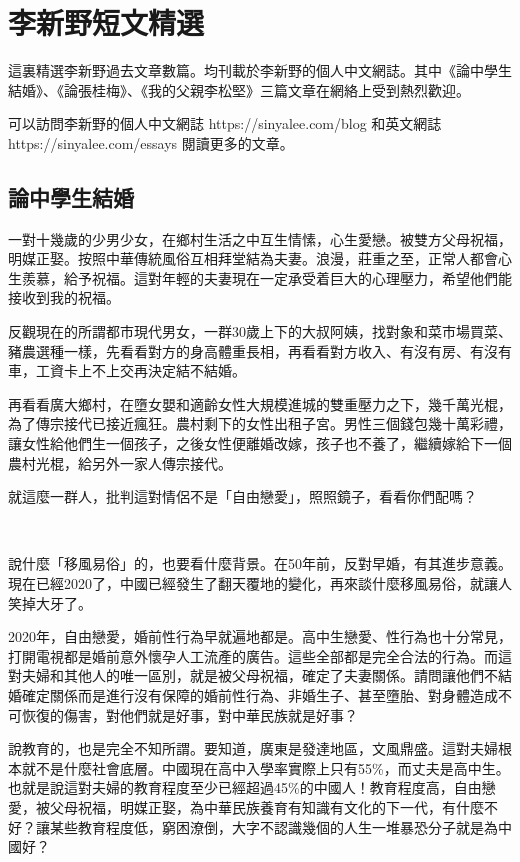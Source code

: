 \chapter{李新野短文精選}

這裏精選李新野過去文章數篇。均刊載於李新野的個人中文網誌。其中《論中學生結婚》、《論張桂梅》、《我的父親李松堅》三篇文章在網絡上受到熱烈歡迎。

可以訪問李新野的個人中文網誌 https://sinyalee.com/blog 和英文網誌 https://sinyalee.com/essays 閱讀更多的文章。

\newpage

\section{論中學生結婚}

一對十幾歲的少男少女，在鄉村生活之中互生情愫，心生愛戀。被雙方父母祝福，明媒正娶。按照中華傳統風俗互相拜堂結為夫妻。浪漫，莊重之至，正常人都會心生羨慕，給予祝福。這對年輕的夫妻現在一定承受着巨大的心理壓力，希望他們能接收到我的祝福。

反觀現在的所謂都市現代男女，一群30歲上下的大叔阿姨，找對象和菜市場買菜、豬農選種一樣，先看看對方的身高體重長相，再看看對方收入、有沒有房、有沒有車，工資卡上不上交再決定結不結婚。

再看看廣大鄉村，在墮女嬰和適齡女性大規模進城的雙重壓力之下，幾千萬光棍，為了傳宗接代已接近瘋狂。農村剩下的女性出租子宮。男性三個錢包幾十萬彩禮，讓女性給他們生一個孩子，之後女性便離婚改嫁，孩子也不養了，繼續嫁給下一個農村光棍，給另外一家人傳宗接代。

就這麼一群人，批判這對情侶不是「自由戀愛」，照照鏡子，看看你們配嗎？

\ 

說什麼「移風易俗」的，也要看什麼背景。在50年前，反對早婚，有其進步意義。現在已經2020了，中國已經發生了翻天覆地的變化，再來談什麼移風易俗，就讓人笑掉大牙了。

2020年，自由戀愛，婚前性行為早就遍地都是。高中生戀愛、性行為也十分常見，打開電視都是婚前意外懷孕人工流產的廣告。這些全部都是完全合法的行為。而這對夫婦和其他人的唯一區別，就是被父母祝福，確定了夫妻關係。請問讓他們不結婚確定關係而是進行沒有保障的婚前性行為、非婚生子、甚至墮胎、對身體造成不可恢復的傷害，對他們就是好事，對中華民族就是好事？

說教育的，也是完全不知所謂。要知道，廣東是發達地區，文風鼎盛。這對夫婦根本就不是什麼社會底層。中國現在高中入學率實際上只有55\%，而丈夫是高中生。也就是說這對夫婦的教育程度至少已經超過45\%的中國人！教育程度高，自由戀愛，被父母祝福，明媒正娶，為中華民族養育有知識有文化的下一代，有什麼不好？讓某些教育程度低，窮困潦倒，大字不認識幾個的人生一堆暴恐分子就是為中國好？

